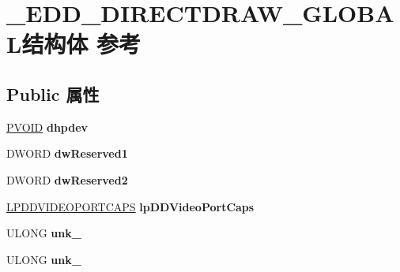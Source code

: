 \hypertarget{struct___e_d_d___d_i_r_e_c_t_d_r_a_w___g_l_o_b_a_l}{}\section{\+\_\+\+E\+D\+D\+\_\+\+D\+I\+R\+E\+C\+T\+D\+R\+A\+W\+\_\+\+G\+L\+O\+B\+A\+L结构体 参考}
\label{struct___e_d_d___d_i_r_e_c_t_d_r_a_w___g_l_o_b_a_l}
\subsection*{Public 属性}
\begin{DoxyCompactItemize}
\item 
\mbox{\label{struct___e_d_d___d_i_r_e_c_t_d_r_a_w___g_l_o_b_a_l_a07360602bc13f20cee71d019e6e6e9a8}} 
\hyperlink{interfacevoid}{P\+V\+O\+ID} {\bfseries dhpdev}
\item 
\mbox{\label{struct___e_d_d___d_i_r_e_c_t_d_r_a_w___g_l_o_b_a_l_a3300ba2a7527118ee574914fd72e0d0b}} 
D\+W\+O\+RD {\bfseries dw\+Reserved1}
\item 
\mbox{\label{struct___e_d_d___d_i_r_e_c_t_d_r_a_w___g_l_o_b_a_l_a24c5e6ff98b1551854bca1bb8ceea4ce}} 
D\+W\+O\+RD {\bfseries dw\+Reserved2}
\item 
\mbox{\label{struct___e_d_d___d_i_r_e_c_t_d_r_a_w___g_l_o_b_a_l_af5af6a42349af8b87f425143c752d897}} 
\hyperlink{struct___d_d_v_i_d_e_o_p_o_r_t_c_a_p_s}{L\+P\+D\+D\+V\+I\+D\+E\+O\+P\+O\+R\+T\+C\+A\+PS} {\bfseries lp\+D\+D\+Video\+Port\+Caps}
\item 
\mbox{\label{struct___e_d_d___d_i_r_e_c_t_d_r_a_w___g_l_o_b_a_l_a7c3a03e04d73deb97677b4252acc1f89}} 
U\+L\+O\+NG {\bfseries unk\+\_}
\item 
\mbox{\label{struct___e_d_d___d_i_r_e_c_t_d_r_a_w___g_l_o_b_a_l_a2d22ce1348b2a34bc4b178ffbe93f05f}} 
U\+L\+O\+NG {\bfseries unk\+\_}

\end{DoxyCompactItemize}
